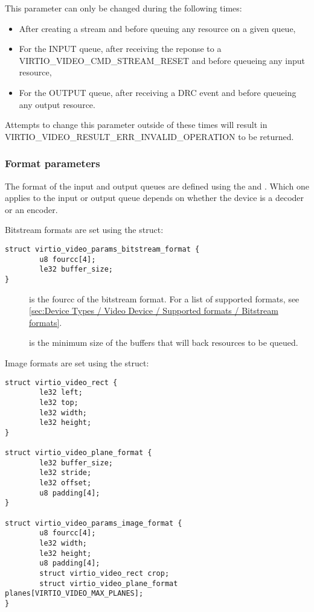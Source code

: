 This parameter can only be changed during the following times:

\begin{itemize}
\item
  After creating a stream and before queuing any resource on a given
  queue,
\item
  For the INPUT queue, after receiving the reponse to a
  VIRTIO_VIDEO_CMD_STREAM_RESET and before queueing any input
  resource,
\item
  For the OUTPUT queue, after receiving a DRC event and before queueing
  any output resource.
\end{itemize}

Attempts to change this parameter outside of these times will result in
VIRTIO_VIDEO_RESULT_ERR_INVALID_OPERATION to be returned.

\subsubsection{Format parameters}\label{sec:Device Types / Video Device / Parameters / Format parameters}

The format of the input and output queues are defined using the
 and
. Which one applies to the input
or output queue depends on whether the device is a decoder or an
encoder.

Bitstream formats are set using the
 struct:

\begin{lstlisting}
struct virtio_video_params_bitstream_format {
        u8 fourcc[4];
        le32 buffer_size;
}
\end{lstlisting}

\begin{description}
\item[]
is the fourcc of the bitstream format. For a list of supported formats,
see
\ref{sec:Device Types / Video Device / Supported formats / Bitstream formats}.
\item[]
is the minimum size of the buffers that will back resources to be
queued.
\end{description}

Image formats are set using the 
struct:

\begin{lstlisting}
struct virtio_video_rect {
        le32 left;
        le32 top;
        le32 width;
        le32 height;
}

struct virtio_video_plane_format {
        le32 buffer_size;
        le32 stride;
        le32 offset;
        u8 padding[4];
}

struct virtio_video_params_image_format {
        u8 fourcc[4];
        le32 width;
        le32 height;
        u8 padding[4];
        struct virtio_video_rect crop;
        struct virtio_video_plane_format planes[VIRTIO_VIDEO_MAX_PLANES];
}
\end{lstlisting}

